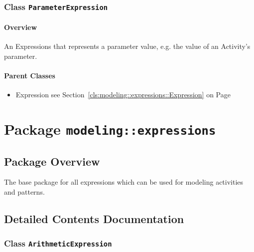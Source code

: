 \subsubsection{\Large{Class \bfseries \texttt{ParameterExpression}\normalfont}}
\label{cls:modeling::calls::expressions::ParameterExpression} 
\paragraph{Overview}

	
			
An Expressions that represents a parameter value, e.g. the value of an Activity's parameter.	
		
	



\paragraph{Parent Classes}
\begin{itemize}
\item Expression see Section~\ref{cls:modeling::expressions::Expression} on Page~\pageref{cls:modeling::expressions::Expression}\end{itemize}
\newpage
		


\section{Package \bfseries \texttt{modeling::expressions}\normalfont}
\subsection{Package Overview}
	
			
The base package for all expressions which can be used for modeling activities
and patterns.	
		
	
			
		



\subsection{Detailed Contents Documentation}
\subsubsection{\Large{Class \bfseries \texttt{ArithmeticExpression}\normalfont}}
\label{cls:modeling::expressions::ArithmeticExpression} 
